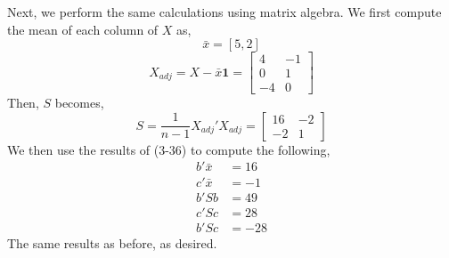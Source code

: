\documentclass[letterpaper,10pt]{article}
\begin{document}
\begin{description}
Next, we perform the same calculations using matrix algebra. We first compute the mean of each column of $X$ as,
\[\bar{x}=[5,2]\]
\[X_{adj}=X-\bar{x}\textbf{1}=\begin{bmatrix}
4 & -1\\0 & 1\\-4 & 0
\end{bmatrix} \]
Then, $S$ becomes,
\[S=\frac{1}{n-1}X_{adj}'X_{adj}=\begin{bmatrix}
16 & -2\\-2 & 1
\end{bmatrix} \]
We then use the results of (3-36) to compute the following,
\begin{align*}
b'\bar{x} &= 16\\
c'\bar{x} &= -1\\
b'Sb &= 49\\
c'Sc &= 28\\
b'Sc &= -28
\end{align*}
The same results as before, as desired.
\end{description}
\end{document}
